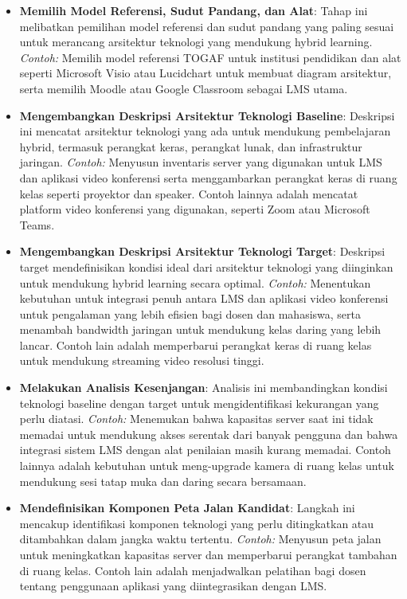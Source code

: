 \begin{itemize}
	\item \textbf{Memilih Model Referensi, Sudut Pandang, dan Alat}: Tahap ini melibatkan pemilihan model referensi dan sudut pandang yang paling sesuai untuk merancang arsitektur teknologi yang mendukung hybrid learning. \emph{Contoh:} Memilih model referensi TOGAF untuk institusi pendidikan dan alat seperti Microsoft Visio atau Lucidchart untuk membuat diagram arsitektur, serta memilih Moodle atau Google Classroom sebagai LMS utama.
	
	\item \textbf{Mengembangkan Deskripsi Arsitektur Teknologi Baseline}: Deskripsi ini mencatat arsitektur teknologi yang ada untuk mendukung pembelajaran hybrid, termasuk perangkat keras, perangkat lunak, dan infrastruktur jaringan. \emph{Contoh:} Menyusun inventaris server yang digunakan untuk LMS dan aplikasi video konferensi serta menggambarkan perangkat keras di ruang kelas seperti proyektor dan speaker. Contoh lainnya adalah mencatat platform video konferensi yang digunakan, seperti Zoom atau Microsoft Teams.
	
	\item \textbf{Mengembangkan Deskripsi Arsitektur Teknologi Target}: Deskripsi target mendefinisikan kondisi ideal dari arsitektur teknologi yang diinginkan untuk mendukung hybrid learning secara optimal. \emph{Contoh:} Menentukan kebutuhan untuk integrasi penuh antara LMS dan aplikasi video konferensi untuk pengalaman yang lebih efisien bagi dosen dan mahasiswa, serta menambah bandwidth jaringan untuk mendukung kelas daring yang lebih lancar. Contoh lain adalah memperbarui perangkat keras di ruang kelas untuk mendukung streaming video resolusi tinggi.
	
	\item \textbf{Melakukan Analisis Kesenjangan}: Analisis ini membandingkan kondisi teknologi baseline dengan target untuk mengidentifikasi kekurangan yang perlu diatasi. \emph{Contoh:} Menemukan bahwa kapasitas server saat ini tidak memadai untuk mendukung akses serentak dari banyak pengguna dan bahwa integrasi sistem LMS dengan alat penilaian masih kurang memadai. Contoh lainnya adalah kebutuhan untuk meng-upgrade kamera di ruang kelas untuk mendukung sesi tatap muka dan daring secara bersamaan.
	
	\item \textbf{Mendefinisikan Komponen Peta Jalan Kandidat}: Langkah ini mencakup identifikasi komponen teknologi yang perlu ditingkatkan atau ditambahkan dalam jangka waktu tertentu. \emph{Contoh:} Menyusun peta jalan untuk meningkatkan kapasitas server dan memperbarui perangkat tambahan di ruang kelas. Contoh lain adalah menjadwalkan pelatihan bagi dosen tentang penggunaan aplikasi yang diintegrasikan dengan LMS.
	

\end{itemize}
